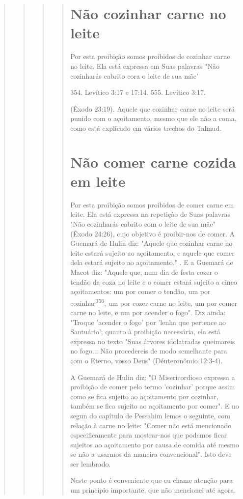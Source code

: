 \begin{quote}
\begin{quote}
\begin{quote}
\begin{quote}
\section{Não cozinhar carne no leite}

Por esta proibição somos proibidos de cozinhar carne no leite. Ela está
expressa em Suas palavras "Não cozinharás cabrito cora o leite de sua
mãe'

354. Levítico 3:17 e 17:14. 555. Levítico 3:17.

(Êxodo 23:19). Aquele que cozinhar carne no leite será punido com o
açoita­mento, mesmo que ele não a coma, como está explicado em vários
trechos do Talmud.

\section{Não comer carne cozida em leite}

Por esta proibição somos proibidos de comer carne em leite. Ela es­tá
expressa na repetiçào de Suas palavras "Não cozinharás cabrito com o
leite de sua mãe" (Êxodo 24:26), cujo objetivo é proibir-nos de comer. A
Guemará de Hulin diz: "Aquele que cozinhar carne no leite estará sujeito
ao açoitamen­to, e aquele que comer dela estará sujeito ao açoitamento."
. E a Guemará de Macot diz: "Aquele que, num dia de festa cozer o tendão
da coxa no leite e o comer estará sujeito a cinco açoitamentos: um por
comer o tendão, um por cozinhar\textsuperscript{356}, um por cozer carne
no leite, um por comer carne no leite, e um por acender o fogo". Diz
ainda: "Troque 'acender o fogo' por 'lenha que per­tence ao Santuário';
quanto à proibição necessária, ela está expressa no texto "Suas árvores
idolatradas queimareis no fogo... Não procedereis de modo se­melhante
para com o Eterno, vosso Deus" (Déuteronômio 12:3-4).

A Guemará de Hulin diz: "O Misericordioso expressa a proibição de comer
pelo termo 'cozinhar' porque assim como se fica sujeito ao açoitamento
por cozinhar, também se fica sujeito ao açoitamento por comer". E no
segun do capítulo de Pessahim lemos o seguinte, com relação à carne no
leite: "Co­mer não está mencionado especificamente para mostrar-nos que
podemos fi­car sujeitos ao açoitamento por causa de comida até mesmo se
não a usarmos da maneira convencional". Isto deve ser lembrado.

Neste ponto é conveniente que eu chame atenção para um princípio
importante, que não mencionei até agora.


\end{quote}
\end{quote}
\end{quote}
\end{quote}
